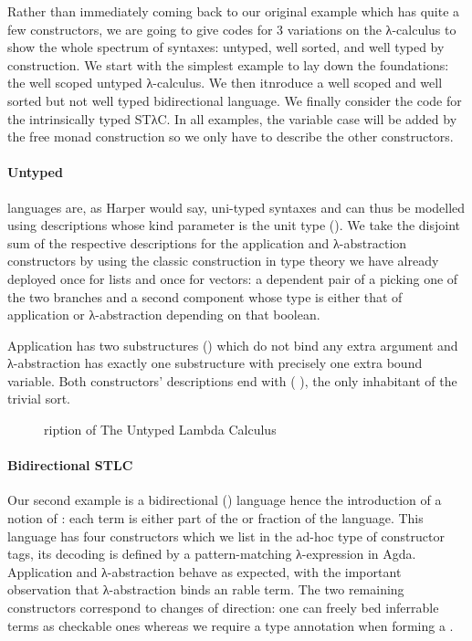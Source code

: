 Rather than immediately coming back to our original example which has quite
a few constructors, we are going to give codes for 3 variations on the
λ-calculus to show the whole spectrum of syntaxes: untyped, well sorted,
and well typed by construction.
%
We start with the simplest example to lay down the foundations: the well
scoped untyped λ-calculus.
%
We then itnroduce a well scoped and well sorted but not well typed
bidirectional language.
%
We finally consider the code for the intrinsically typed STλC.
%
In all examples, the variable case will be added by the free monad
construction so we only have to describe the other constructors.

\paragraph{Untyped} languages are, as Harper would say, uni-typed syntaxes and
can thus be modelled using descriptions whose kind parameter is the unit type
().
%
We take the disjoint sum of the respective descriptions for the application
and λ-abstraction constructors by using the classic construction in type
theory we have already deployed once for lists and once for vectors: a
dependent pair of a  picking one of the two branches and a second
component whose type is either that of application or λ-abstraction depending
on that boolean.

Application has two substructures () which do not bind any extra
argument and λ-abstraction has exactly one substructure with precisely
one extra bound variable. Both constructors' descriptions end with
( ), the only inhabitant of the trivial sort.

\begin{figure}[h]
\caption{ription of The Untyped Lambda Calculus
\label{fig:desculc}\label{fig:descUTLC}}
\end{figure}

\paragraph{Bidirectional STLC}\label{par:bidirectional} Our second example
is a bidirectional (\cite{pierce2000local}) language hence the introduction
of a notion of : each term is either part of the  or
 fraction of the language. This language has four constructors
which we list in the ad-hoc  type of constructor tags, its
decoding  is defined by a pattern-matching λ-expression in Agda.
Application and λ-abstraction behave as expected, with the important
observation that λ-abstraction binds an rable term. The two
remaining constructors correspond to changes of direction: one can freely
bed inferrable terms as checkable ones whereas we require a type
annotation when forming a .

